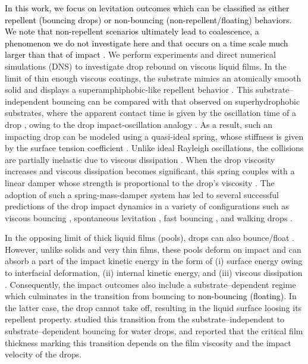 \documentclass[]{jfm}
\newcommand{\revRev}[1]{\textcolor{black}{#1}}
\begin{document}
	\revRev{In this work, we focus on levitation outcomes which can be classified as either repellent (bouncing drops) or non-bouncing (non-repellent/floating) behaviors.
		We note that non-repellent scenarios ultimately lead to coalescence, a phenomenon we do not investigate here and that occurs on a time scale much larger than that of impact  \citep{lo2017mechanism, duchemin2020dimple}.}
	We perform experiments and direct numerical simulations (DNS) to investigate drop rebound on viscous liquid films.
	In the limit of thin enough viscous coatings, the substrate mimics an atomically smooth solid and displays a superamphiphobic-like repellent behavior \citep{hao2015superhydrophobic, lo2017mechanism}. This substrate--independent bouncing \citep{gilet2012droplets, pack2017failure, lakshman2021deformation} can be compared with that observed on superhydrophobic substrates, where the apparent contact time is given by the oscillation time of a drop \citep{rayleigh1879capillary}, owing to the drop impact-oscillation analogy \citep{richard2002contact}.
	As a result, such an impacting drop can be modeled using a quasi-ideal spring, whose stiffness is given by the surface tension coefficient \citep{okumura2003water}.
	Unlike ideal Rayleigh oscillations, the collisions are partially inelastic due to viscous dissipation \citep{prosperetti1977viscous}. 
	When the drop viscosity increases and viscous dissipation becomes significant, this spring couples with a linear damper whose strength is proportional to the drop's viscosity \citep[see appendix~\ref{app:SubstrateIndependentBouncing}, and][]{jha2020viscous}. The adoption of such a spring-mass-damper system has led to several successful predictions of the drop impact dynamics in a variety of configurations such as viscous bouncing \citep{molavcek2012quasi, jha2020viscous}, spontaneous levitation \citep{schutzius2015spontaneous}, fast bouncing \citep{chantelot2018drop}, and walking drops \citep{terwagne2013role}. 
	
	In the opposing limit of thick liquid films (pools), drops can also bounce/float \citep{reynolds1881floating, jayaratne1964coalescence}. However, unlike solids and very thin films, these pools deform on impact and can absorb a part of the impact kinetic energy in the form of (i) surface energy owing to interfacial deformation, (ii) internal kinetic energy, and (iii) viscous dissipation \citep{galeano2021capillary}. Consequently, the impact outcomes also include a substrate--dependent regime which culminates in the transition from bouncing to \revRev{non-bouncing (floating)}. In the latter case, the drop cannot take off, resulting in the liquid surface loosing its repellent property. \citet{hao2015superhydrophobic} studied this transition from the substrate--independent to substrate--dependent bouncing for water drops, and reported that the critical film thickness marking this transition depends on the film viscosity and the impact velocity of the drops.
	
\end{document}

